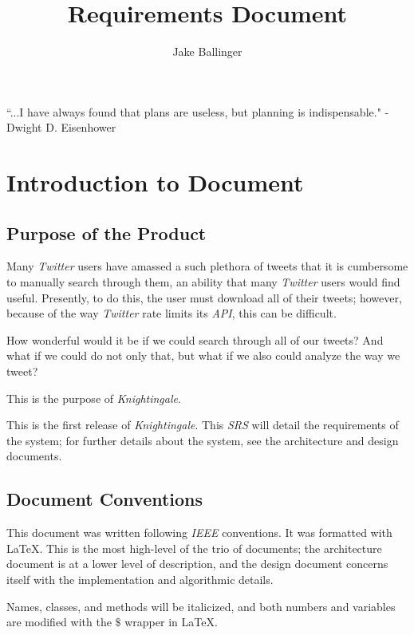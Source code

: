 \documentclass[a4paper, 12pt]{article}
\title{Requirements Document}
\author{Jake Ballinger}
\begin{document}
\maketitle

\begin{center}
\centering  ``...I have always found that plans are useless, but planning is indispensable." \newline
\centering - Dwight D. Eisenhower
\end{center}

\section{Introduction to Document} \label{sec:intro}
\subsection{Purpose of the Product} \label{sec:purpose}
\begin{adjustwidth}{2em}{0pt}
Many \textit{Twitter} users have amassed a such plethora of tweets that it is cumbersome to manually search through them, an ability that many \textit{Twitter} users would find useful. Presently, to do this, the user must download all of their tweets; however, because of the way \textit{Twitter} rate limits its \textit{API}, this can be difficult. \newline

\noindent How wonderful would it be if we could search through all of our tweets? And what if we could do not only that, but what if we also could analyze the way we tweet?\newline

\noindent This is the purpose of \textit{Knightingale}. \newline

\noindent This is the first release of \textit{Knightingale}. This \textit{SRS} will detail the requirements of the system; for further details about the system, see the architecture and design documents.
\end{adjustwidth}

\subsection{Document Conventions} \label{sec:conventions}
\begin{adjustwidth}{2em}{0pt}
This document was written following \textit{IEEE} conventions. It was formatted with \LaTeX. This is the most high-level of the trio of documents; the architecture document is at a lower level of description, and the design document concerns itself with the implementation and algorithmic details. \newline

\noindent Names, classes, and methods will be italicized, and both numbers and variables are modified with the $\$$ wrapper in \LaTeX.
\end{adjustwidth}
\end{document}
